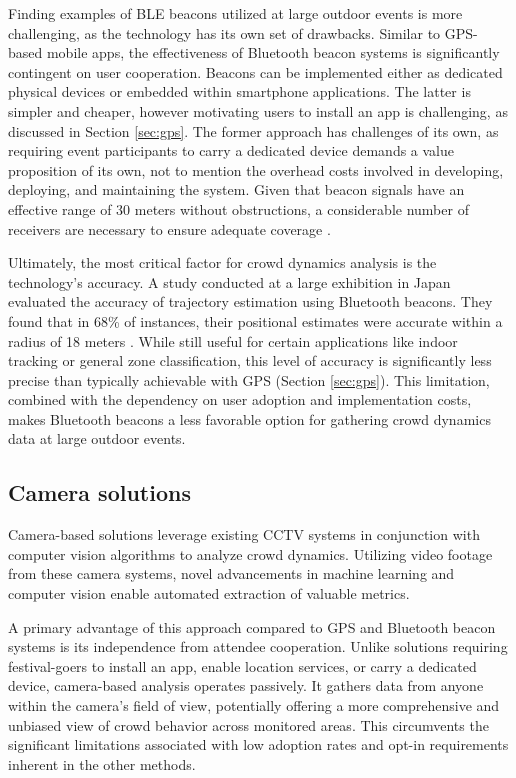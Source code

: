 Finding examples of BLE beacons utilized at large outdoor events is more challenging, as the technology has its own set of drawbacks. Similar to GPS-based mobile apps, the effectiveness of Bluetooth beacon systems is significantly contingent on user cooperation. Beacons can be implemented either as dedicated physical devices or embedded within smartphone applications. The latter is simpler and cheaper, however motivating users to install an app is challenging, as discussed in Section \ref{sec:gps}. The former approach has challenges of its own, as requiring event participants to carry a dedicated device demands a value proposition of its own, not to mention the overhead costs involved in developing, deploying, and maintaining the system. Given that beacon signals have an effective range of 30 meters without obstructions, a considerable number of receivers are necessary to ensure adequate coverage \cite{bt_beacon}.

Ultimately, the most critical factor for crowd dynamics analysis is the technology's accuracy. A study conducted at a large exhibition in Japan evaluated the accuracy of trajectory estimation using Bluetooth beacons. They found that  in 68\% of instances, their positional estimates were accurate within a radius of 18 meters \cite{bt_japan}. While still useful for certain applications like indoor tracking or general zone classification, this level of accuracy is significantly less precise than typically achievable with GPS (Section \ref{sec:gps}). This limitation, combined with the dependency on user adoption and implementation costs, makes Bluetooth beacons a less favorable option for gathering crowd dynamics data at large outdoor events.

\subsection{Camera solutions}
Camera-based solutions leverage existing CCTV systems in conjunction with computer vision algorithms to analyze crowd dynamics. Utilizing video footage from these camera systems, novel advancements in machine learning and computer vision enable automated extraction of valuable metrics.

A primary advantage of this approach compared to GPS and Bluetooth beacon systems is its independence from attendee cooperation. Unlike solutions requiring festival-goers to install an app, enable location services, or carry a dedicated device, camera-based analysis operates passively. It gathers data from anyone within the camera's field of view, potentially offering a more comprehensive and unbiased view of crowd behavior across monitored areas. This circumvents the significant limitations associated with low adoption rates and opt-in requirements inherent in the other methods.

